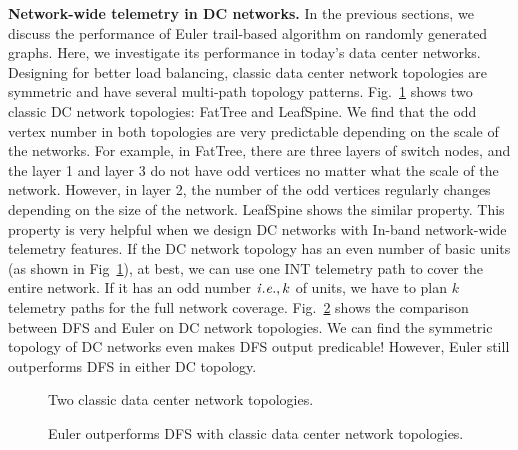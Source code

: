 \textbf{Network-wide telemetry in DC networks.}
In the previous sections, we discuss the performance of Euler trail-based algorithm on randomly generated graphs. Here, we investigate its performance in today's data center networks. Designing for better load balancing, classic data center network topologies are symmetric and have several multi-path topology patterns. Fig.~\ref{fig:dc} shows two classic DC network topologies: FatTree and LeafSpine. We find that the odd vertex number in both topologies are very predictable depending on the scale of the networks. For example, in FatTree, there are three layers of switch nodes, and the layer 1 and layer 3 do not have odd vertices no matter what the scale of the network. However, in layer 2, the number of the odd vertices regularly changes depending on the size of the network. LeafSpine shows the similar property. This property is very helpful when we design DC networks with In-band network-wide telemetry features. If the DC network topology has an even number of basic units (as shown in Fig~\ref{fig:dc}), at best, we can use one INT telemetry path to cover the entire network. If it has an odd number ${\it i.e.}, k$ of units, we have to plan $k$ telemetry paths for the full network coverage. Fig.~\ref{fig:topo} shows the comparison between DFS and Euler on DC network topologies. We can find the symmetric topology of DC networks even makes DFS output predicable! However, Euler still outperforms DFS in either DC topology.

\begin{figure}
\centering
{}
\vspace{-0.3cm}
\caption{Two classic data center network topologies.}
\label{fig:dc}
\vspace{-0.4cm}
\end{figure}



\begin{figure}[t]
\vspace{-0.0in}
\centering
{}
\vspace{-0.15cm}
\vspace{-0.15cm}
\caption{Euler outperforms DFS with classic data center network topologies.}
\label{fig:topo}
\vspace{-0.4cm}
\end{figure}